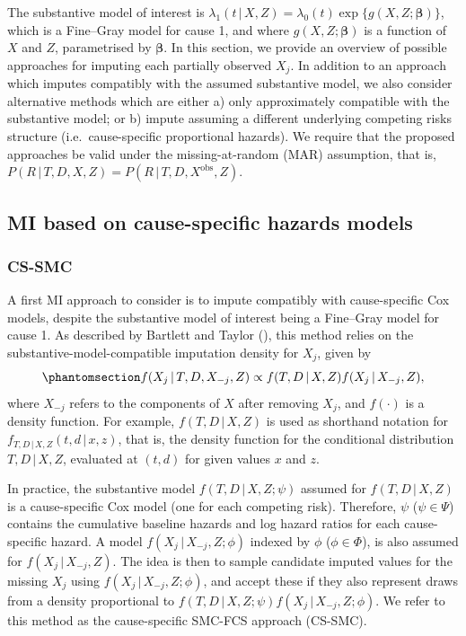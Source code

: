 \documentclass[
  letterpaper,
  DIV=11,
  numbers=noendperiod]{scrreprt}
\newcommand{\given}{\,|\,}
\begin{document}
The substantive model of interest is
\(\lambda_1(t \given X, Z) = \lambda_{0}(t)\exp\{g(X,Z;\boldsymbol{\beta})\}\),
which is a Fine--Gray model for cause 1, and where
\(g(X,Z;\boldsymbol{\beta})\) is a function of \(X\) and \(Z\),
parametrised by \(\boldsymbol{\beta}\). In this section, we provide an
overview of possible approaches for imputing each partially observed
\(X_j\). In addition to an approach which imputes compatibly with the
assumed substantive model, we also consider alternative methods which
are either a) only approximately compatible with the substantive model;
or b) impute assuming a different underlying competing risks structure
(i.e.~cause-specific proportional hazards). We require that the proposed
approaches be valid under the missing-at-random (MAR) assumption, that
is, \(P(R \given T, D, X, Z) = P(R \given T, D, X^{\text{obs}}, Z)\).

\subsection{MI based on cause-specific hazards
models}\label{mi-based-on-cause-specific-hazards-models}

\subsubsection{CS-SMC}\label{sec-cs-smc}

A first MI approach to consider is to impute compatibly with
cause-specific Cox models, despite the substantive model of interest
being a Fine--Gray model for cause 1. As described by Bartlett and
Taylor (),
this method relies on the substantive-model-compatible imputation
density for \(X_j\), given by
\begin{equation}\phantomsection\label{eq-imput-dens}{
f(X_j \given T, D, X_{-j}, Z) \propto f(T, D \given X, Z)f(X_j \given X_{-j},Z),
}\end{equation} where \(X_{-j}\) refers to the components of \(X\) after
removing \(X_j\), and \(f(\cdot)\) is a density function. For example,
\(f(T, D \given X, Z)\) is used as shorthand notation for
\(f_{T, D \given X, Z}(t, d \given x,z)\), that is, the density function
for the conditional distribution \(T, D \given X, Z\), evaluated at
\((t,d)\) for given values \(x\) and \(z\).

\sloppy In practice, the substantive model \(f(T, D \given X, Z;\psi)\)
assumed for \(f(T, D \given X, Z)\) is a cause-specific Cox model (one
for each competing risk). Therefore, \(\psi\) (\(\psi \in \Psi\))
contains the cumulative baseline hazards and log hazard ratios for each
cause-specific hazard. A model \(f(X_j \given X_{-j},Z;\phi)\) indexed
by \(\phi\) (\(\phi \in \Phi\)), is also assumed for
\(f(X_j \given X_{-j},Z)\). The idea is then to sample candidate imputed
values for the missing \(X_j\) using \(f(X_j \given X_{-j},Z;\phi)\),
and accept these if they also represent draws from a density
proportional to \(f(T, D \given X, Z;\psi)f(X_j \given X_{-j},Z;\phi)\).
We refer to this method as the cause-specific SMC-FCS approach (CS-SMC).
\end{document}

